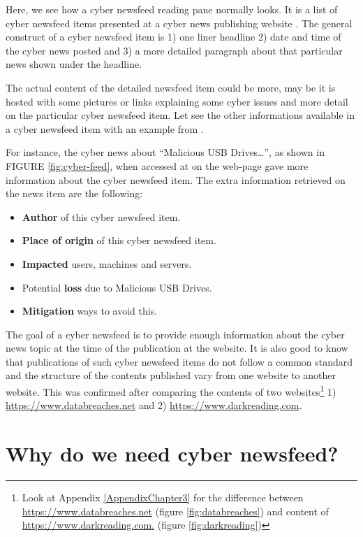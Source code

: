 Here, we see how a cyber newsfeed reading pane normally looks. 
It is a list of  cyber newsfeed items presented at a cyber news publishing  website \citep{news-feed}. 
The general construct of a cyber newsfeed item is 
1) one liner headline 
2) date and time of the cyber news posted and 
3) a more detailed paragraph about that particular news shown under the headline. 

The actual content of the detailed newsfeed item could be more, may be it is hosted with some pictures or links explaining some cyber issues and more detail on the particular cyber newsfeed item. Let see the other informations available in a cyber newsfeed item with an example from \citep{news-feed}.

For instance, the cyber news about \enquote{Malicious USB Drives…}, as shown in FIGURE \ref{fig:cyber-feed}, when accessed at \citep{news-feed} on the web-page gave more information about the cyber newsfeed item.  The extra information retrieved on the news item are the following: 

\begin{itemize}
  \item \textbf{Author} of this cyber newsfeed item.
  \item \textbf{Place of origin} of this cyber newsfeed item.
  \item \textbf{Impacted}  users, machines and servers.
  \item Potential \textbf{loss} due to Malicious USB Drives.
  \item \textbf{Mitigation} ways to avoid this.
\end{itemize}

The goal of a cyber newsfeed is to provide enough information about the cyber news topic at the time of the publication at the website. 
It is also good to know that publications of such cyber newsfeed items do not follow a common standard and the structure of the contents published vary from one website to another website. This was confirmed after comparing the contents of two websites\footnote{Look at Appendix \ref{AppendixChapter3} for the difference between \url{https://www.databreaches.net}
(figure \ref{fig:databreaches}) 
and content of 
\url{https://www.darkreading.com.} 
(figure \ref{fig:darkreading})} 
1) \url{https://www.databreaches.net} and 
2) \url{ https://www.darkreading.com}.

\section{Why do we need cyber newsfeed?}


